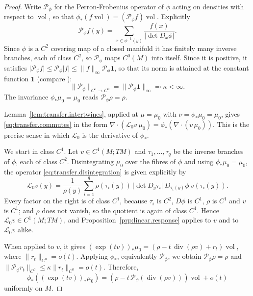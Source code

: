 \documentclass[11pt,reqno]{amsart}
\theoremstyle{plain}
\theoremstyle{definition}
\newcommand{\Transf}{\mathcal{L}}
\newcommand{\PF}{\mathcal{P}}
\DeclareMathOperator{\vol}{vol}
\DeclareMathOperator{\Div}{div}
\begin{document}
\begin{proof}
    Write \( \PF_\phi  \) for the Perron-Frobenius operator of \( \phi \) acting on densities with respect to \( \vol \), so that \( \phi_\ast(f\vol)=(\PF_\phi f)\vol \).
    Explicitly
    \[
        \PF_\phi f(y)=\sum_{x\in\phi^{-1}(y)}\frac{f(x)}{\lvert\det D_x\phi\rvert} .
    \]
    Since \( \phi \) is a \( C^2 \) covering map of a closed manifold it has finitely many inverse branches, each of class \( C^2 \), so \( \PF_\phi  \) maps \( C^0(M) \) into itself.
    Since it is positive, it satisfies \( \lvert\PF_\phi f\rvert\le\PF_\phi \lvert f\rvert\le\lVert f\rVert_\infty\PF_\phi \mathbf 1 \), so that its norm is attained at the constant function \( \mathbf 1 \) (compare \cite[Chapter~2]{baladi_positive_2000}):
    \[
        \big\lVert\PF_\phi \big\rVert_{C^0\to C^0}=\big\lVert\PF_\phi \mathbf 1\big\rVert_\infty\eqqcolon\kappa<\infty .
    \]
    The invariance \( \phi_\ast\mu_0=\mu_0 \) reads \( \PF_\phi \rho=\rho \).

	Lemma~\ref{lem:transfer.intertwines}, applied at \( \mu=\mu_0 \) with \( \nu=\phi_\ast\mu_0=\mu_0 \), gives \eqref{eq:transfer.commutes} in the form \( \nabla\!\cdot(\Transf_0v\ \mu_0)=\phi_\ast(\nabla\!\cdot(v\,\mu_0)) \).
    This is the precise sense in which \( \Transf_0 \) is the derivative of \( \phi_\ast \).

    We start in class \(C^1\).
    Let \( v\in C^1(M;TM) \) and \( \tau_1,\dots,\tau_q \) be the inverse branches of \( \phi \), each of class \( C^2 \).
    Disintegrating \( \mu_0 \) over the fibres of \( \phi \) and using \( \phi_\ast\mu_0=\mu_0 \), the operator \eqref{eq:transfer.disintegration} is given explicitly by
    \begin{equation}\label{eq:transfer.branches}
        \Transf_0v(y)=\frac{1}{\rho(y)}\sum_{i=1}^q\rho\left(\tau_i(y)\right)\,\big\lvert\det D_y\tau_i\big\rvert\ D_{\tau_i(y)}\phi\ v\left(\tau_i(y)\right) .
    \end{equation}
    Every factor on the right is of class \( C^1 \), because \( \tau_i \) is \( C^2 \), \( D\phi \) is \( C^1 \), \( \rho \) is \( C^1 \) and \( v \) is \( C^1 \); and \( \rho \) does not vanish, so the quotient is again of class \( C^1 \).
    Hence \( \Transf_0v\in C^1(M;TM) \), and Proposition~\ref{prp:linear.response} applies to \( v \) and to \( \Transf_0v \) alike.

    When applied to \(v\), it gives \((\exp(tv))_\ast\mu_0 = \left(\rho-t\,\Div(\rho v) +r_t\right)\vol\), where \(\lVert r_t\rVert_{C^0}=o(t)\).
    Applying \(\phi_\ast\), equivalently \(\PF_\phi \), we obtain \(\PF_\phi \rho=\rho\) and \(\lVert\PF_\phi r_t\rVert_{C^0} \le\kappa\lVert r_t\rVert_{C^0}=o(t)\).
    Therefore,
    \[
        \phi_\ast\left((\exp(tv))_\ast\mu_0\right)=\left(\rho-t\,\PF_\phi \left(\Div(\rho v)\right)\right)\vol+o(t)
    \]
    uniformly on \(M\).
   

\end{proof}
\end{document}
